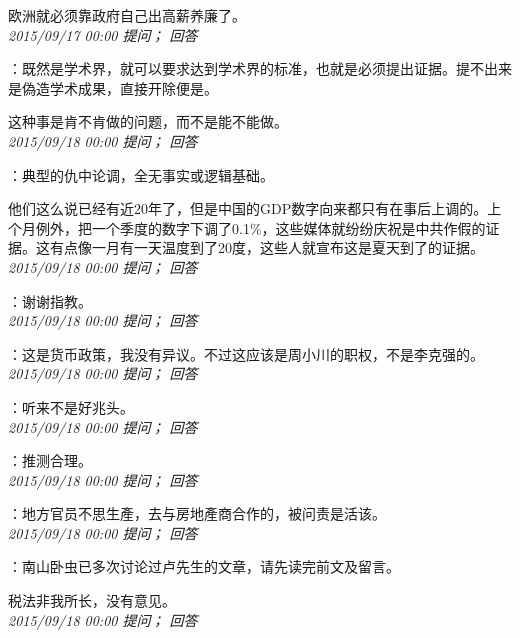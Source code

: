 \documentclass[twocolumn]{ctexart}
\begin{document}
欧洲就必须靠政府自己出高薪养廉了。\\

\textit{\hfill\noindent\small 2015/09/17 00:00 提问； 回答}

：既然是学术界，就可以要求达到学术界的标准，也就是必须提出证据。提不出来是偽造学术成果，直接开除便是。

这种事是肯不肯做的问题，而不是能不能做。\\

\textit{\hfill\noindent\small 2015/09/18 00:00 提问； 回答}

：典型的仇中论调，全无事实或逻辑基础。

他们这么说已经有近20年了，但是中国的GDP数字向来都只有在事后上调的。上个月例外，把一个季度的数字下调了0.1\%，这些媒体就纷纷庆祝是中共作假的证据。这有点像一月有一天温度到了20度，这些人就宣布这是夏天到了的证据。\\

\textit{\hfill\noindent\small 2015/09/18 00:00 提问； 回答}

：谢谢指教。\\

\textit{\hfill\noindent\small 2015/09/18 00:00 提问； 回答}

：这是货币政策，我没有异议。不过这应该是周小川的职权，不是李克强的。\\

\textit{\hfill\noindent\small 2015/09/18 00:00 提问； 回答}

：听来不是好兆头。\\

\textit{\hfill\noindent\small 2015/09/18 00:00 提问； 回答}

：推测合理。\\

\textit{\hfill\noindent\small 2015/09/18 00:00 提问； 回答}

：地方官员不思生產，去与房地產商合作的，被问责是活该。\\

\textit{\hfill\noindent\small 2015/09/18 00:00 提问； 回答}

：南山卧虫已多次讨论过卢先生的文章，请先读完前文及留言。

税法非我所长，没有意见。\\

\textit{\hfill\noindent\small 2015/09/18 00:00 提问； 回答}
\end{document}
